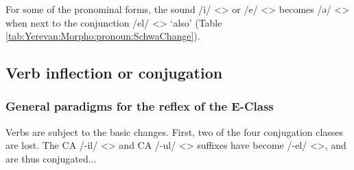 For some of the pronominal forms, the sound /i/ <> or /e/ <> becomes /ə/ <> when next to the conjunction /el/ <> `also' (Table \ref{tab:Yerevan:Morpho:pronoun:SchwaChange}).


\begin{table}[H]
	\centering
	\caption{Replacement of /i,e/ with /ə/ in cliticized pronouns in the Yerevan dialect}
	\label{tab:Yerevan:Morpho:pronoun:SchwaChange}
\end{table}

\subsection{Verb inflection or conjugation}

\subsubsection{General paradigms for the reflex of the E-Class}\label{sec:Yerevan:morpho:verb:paradigm}
Verbs are subject to the basic changes. First, two of the four conjugation classes are lost. The CA /-il/ <> and CA /-ul/ <> suffixes have become /-el/ <>, and are thus conjugated... 



